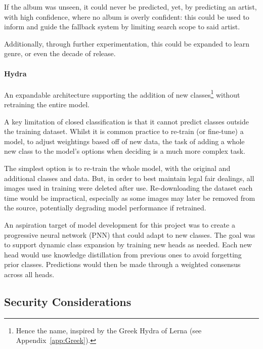                 If the album was unseen, it could never be predicted, yet, by predicting an artist, with high confidence, where no album is overly confident: this could be used to inform and guide the fallback system by limiting search scope to said artist.
    
                Additionally, through further experimentation, this could be expanded to learn genre, or even the decade of release.
    
                \paragraph{Hydra} An expandable architecture supporting the addition of new classes\footnote{Hence the name, inspired by the Greek Hydra of Lerna (see Appendix~\ref{app:Greek}).} without retraining the entire model.
                
    
                A key limitation of closed classification is that it cannot predict classes outside the training dataset. Whilst it is common practice to re-train (or fine-tune) a model, to adjust weightings based off of new data, the task of adding a whole new class to the model's options when deciding is a much more complex task.
    
                The simplest option is to re-train the whole model, with the original and additional classes and data. But, in order to best maintain legal fair dealings, all images used in training were deleted after use. Re-downloading the dataset each time would be impractical, especially as some images may later be removed from the source, potentially degrading model performance if retrained.
    
                An aspiration target of model development for this project was to create a progressive neural network (PNN) that could adapt to new classes. The goal was to support dynamic class expansion by training new heads as needed. Each new head would use knowledge distillation from previous ones to avoid forgetting prior classes. Predictions would then be made through a weighted consensus across all heads.
    
        \subsection{Security Considerations} \label{sec:security}
            
